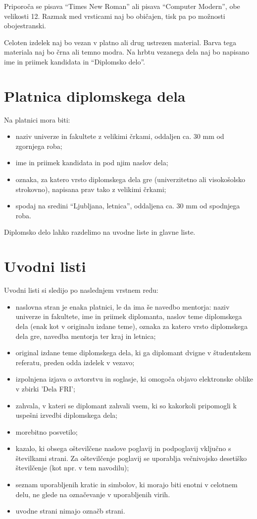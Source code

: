 \documentclass[12pt,a4paper,openany]{book}
\begin{document}
Priporoča se pisava ``Times New Roman'' ali pisava ``Computer Modern'', obe velikosti 12. 
Razmak med vrsticami naj bo običajen, tisk pa po možnosti obojestranski.

Celoten izdelek naj bo vezan v platno ali drug ustrezen material. 
Barva tega materiala naj bo črna ali temno modra. 
Na hrbtu vezanega dela naj bo napisano ime in priimek kandidata in ``Diplomsko delo''.

\section{Platnica diplomskega dela}
Na platnici mora biti: 
\begin{itemize}
\item	naziv univerze in fakultete z velikimi črkami, oddaljen ca. 30 mm od zgornjega roba; 
\item	ime in priimek kandidata in pod njim naslov dela;
\item	oznaka, za katero vrsto diplomskega dela gre (univerzitetno ali visoko\-šol\-sko strokovno), napisana prav tako z velikimi črkami;
\item	spodaj na sredini ``Ljubljana, letnica'', oddaljena ca. 30 mm od spodnjega roba. 
\end{itemize}
Diplomsko delo lahko razdelimo na uvodne liste in glavne liste.

\section{Uvodni listi}
Uvodni listi si sledijo po naslednjem vrstnem redu: 
\begin{itemize}
\item	
naslovna stran je enaka platnici, le da ima še navedbo mentorja:
naziv univerze in fakultete, ime in priimek diplomanta, 
naslov teme diplom\-ske\-ga dela (enak kot v originalu izdane teme), oznaka za katero vrsto diplomskega dela gre, navedba mentorja ter kraj in
letnica; 
\item	original izdane teme diplomskega dela, ki ga diplomant dvigne v študent\-skem referatu, preden odda izdelek v vezavo;
\item izpolnjena izjava o avtorstvu in soglasje, ki omogoča objavo elektronske oblike v zbirki 'Dela FRI'; 
\item	zahvala, v kateri se diplomant zahvali vsem, ki so kakorkoli pripomogli k uspešni izvedbi diplomskega dela; 
\item	morebitno posvetilo;
\item	kazalo, ki obsega oštevilčene naslove poglavij in podpoglavij vključno s številkami strani. 
Za oštevilčenje poglavij se uporablja večnivojsko desetiško številčenje (kot npr. v tem navodilu);
\item	seznam uporabljenih kratic in simbolov, ki morajo biti enotni v celotnem delu, ne glede na označevanje v uporabljenih virih. 
\item uvodne strani nimajo označb strani.
\end{itemize}
\end{document}
